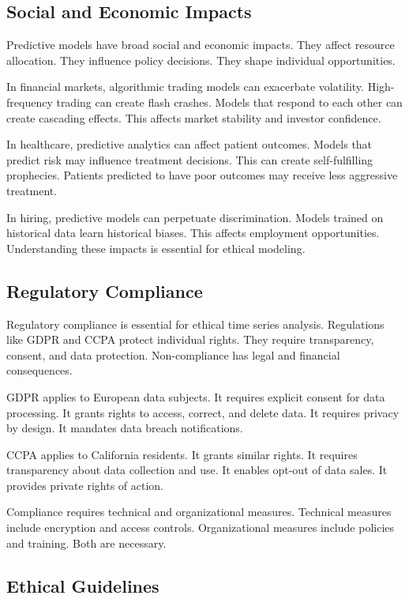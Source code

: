 \subsection{Social and Economic Impacts}

Predictive models have broad social and economic impacts. They affect resource allocation. They influence policy decisions. They shape individual opportunities.

In financial markets, algorithmic trading models can exacerbate volatility. High-frequency trading can create flash crashes. Models that respond to each other can create cascading effects. This affects market stability and investor confidence.

In healthcare, predictive analytics can affect patient outcomes. Models that predict risk may influence treatment decisions. This can create self-fulfilling prophecies. Patients predicted to have poor outcomes may receive less aggressive treatment.

In hiring, predictive models can perpetuate discrimination. Models trained on historical data learn historical biases. This affects employment opportunities. Understanding these impacts is essential for ethical modeling.

\subsection{Regulatory Compliance}

Regulatory compliance is essential for ethical time series analysis. Regulations like GDPR and CCPA protect individual rights. They require transparency, consent, and data protection. Non-compliance has legal and financial consequences.

GDPR applies to European data subjects. It requires explicit consent for data processing. It grants rights to access, correct, and delete data. It requires privacy by design. It mandates data breach notifications.

CCPA applies to California residents. It grants similar rights. It requires transparency about data collection and use. It enables opt-out of data sales. It provides private rights of action.

Compliance requires technical and organizational measures. Technical measures include encryption and access controls. Organizational measures include policies and training. Both are necessary.

\subsection{Ethical Guidelines}

